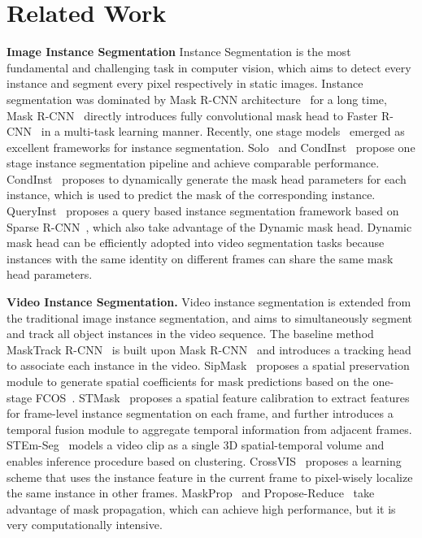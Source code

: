 \documentclass[runningheads]{llncs}
\begin{document}
\section{Related Work}
\label{sec:relatedwork}

\noindent\textbf{Image Instance Segmentation}
Instance Segmentation is the most fundamental and challenging task in computer vision, which aims to detect every instance and segment every pixel respectively in static images. 
Instance segmentation was dominated by Mask R-CNN architecture~\cite{MaskRCNN,PANet,maskscore} for a long time, Mask R-CNN~\cite{MaskRCNN} directly introduces fully convolutional mask head to Faster R-CNN~\cite{fastercnn} in a multi-task learning manner. Recently, one stage models~\cite{tensormask,solo,polarmask,tian2020conditional} emerged as excellent frameworks for instance segmentation. Solo~\cite{solo} and CondInst~\cite{tian2020conditional} propose one stage instance segmentation pipeline and achieve comparable performance. CondInst~\cite{tian2020conditional} proposes to dynamically generate the mask head parameters for each instance, which is used to predict the mask of the corresponding instance. QueryInst~\cite{queryinst} proposes a query based instance segmentation framework based on Sparse R-CNN~\cite{sparsercnn}, which also take advantage of the Dynamic mask head. 
Dynamic mask head can be efficiently adopted into video segmentation tasks because 
instances with the same identity on different frames can share the same mask head parameters.



\noindent\textbf{Video Instance Segmentation.}
Video instance segmentation is extended from the traditional image instance segmentation, and aims to simultaneously segment and track all object instances in the video sequence.
The baseline method MaskTrack R-CNN~\cite{yang2019video} is built upon Mask R-CNN~\cite{MaskRCNN} and introduces a tracking head to associate each instance in the video.
SipMask~\cite{cao2020sipmask} proposes a spatial preservation module to generate spatial coefficients for mask predictions based on the one-stage FCOS~\cite{FCOS}.
STMask~\cite{STMask} proposes a spatial feature calibration to extract features for frame-level instance segmentation on each frame, and further introduces a temporal fusion module to aggregate temporal information from adjacent frames.
STEm-Seg~\cite{athar2020stem} models a video clip as a single 3D spatial-temporal volume and enables inference procedure based on clustering.
CrossVIS~\cite{yang2021crossover} proposes a learning scheme that uses the instance feature in the current frame to pixel-wisely localize the same instance in other frames.
MaskProp~\cite{MaskProp} and Propose-Reduce~\cite{ProposeReduce} take advantage of mask propagation, which can achieve high performance, but it is very computationally intensive.
\end{document}
